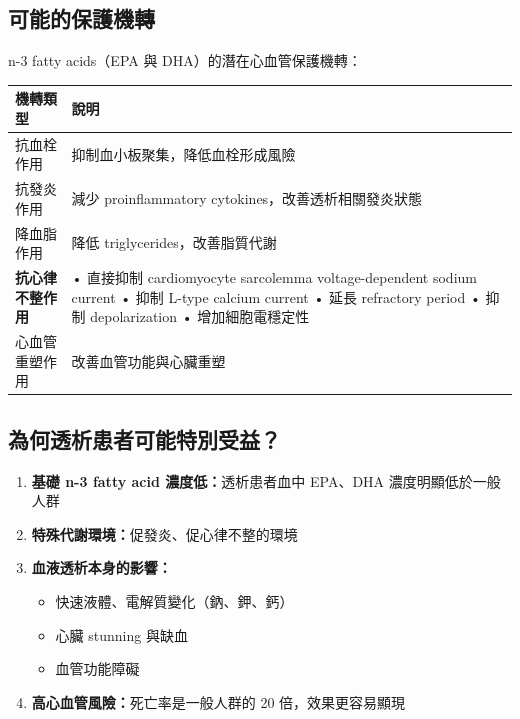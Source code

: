\documentclass[12pt,a4paper]{article}
\begin{document}
\subsection{可能的保護機轉}

n-3 fatty acids（EPA 與 DHA）的潛在心血管保護機轉：

\begin{longtable}{p{4cm}p{10cm}}
\toprule
\textbf{機轉類型} & \textbf{說明} \\
\midrule
\endfirsthead

\bottomrule
\endfoot

抗血栓作用 & 抑制血小板聚集，降低血栓形成風險 \\
抗發炎作用 & 減少 proinflammatory cytokines，改善透析相關發炎狀態 \\
降血脂作用 & 降低 triglycerides，改善脂質代謝 \\
\textbf{抗心律不整作用} &
• 直接抑制 cardiomyocyte sarcolemma voltage-dependent sodium current\newline
• 抑制 L-type calcium current\newline
• 延長 refractory period\newline
• 抑制 depolarization\newline
• 增加細胞電穩定性 \\
心血管重塑作用 & 改善血管功能與心臟重塑 \\
\bottomrule
\end{longtable}

\subsection{為何透析患者可能特別受益？}

\begin{enumerate}
    \item \textbf{基礎 n-3 fatty acid 濃度低：}透析患者血中 EPA、DHA 濃度明顯低於一般人群
    \item \textbf{特殊代謝環境：}促發炎、促心律不整的環境
    \item \textbf{血液透析本身的影響：}
    \begin{itemize}
        \item 快速液體、電解質變化（鈉、鉀、鈣）
        \item 心臟 stunning 與缺血
        \item 血管功能障礙
    \end{itemize}
    \item \textbf{高心血管風險：}死亡率是一般人群的 20 倍，效果更容易顯現
\end{enumerate}
\end{document}
